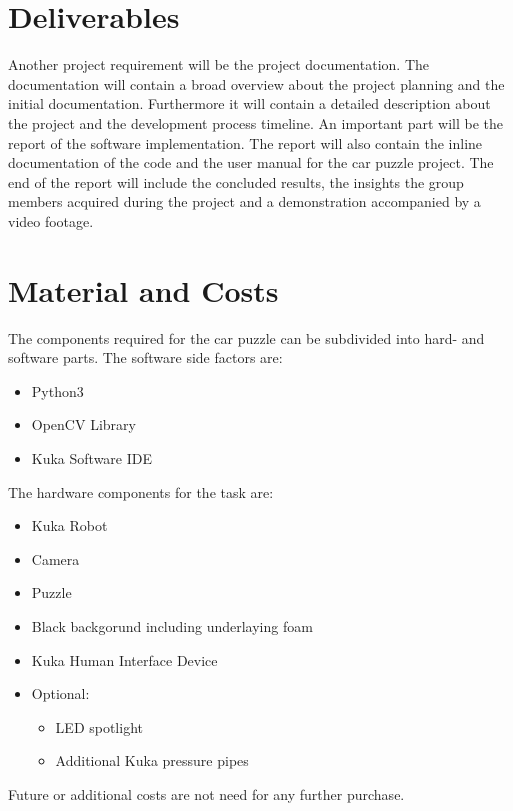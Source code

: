 \documentclass[a4paper, 12pt]{scrartcl}%
\begin{document}
\section{Deliverables}
Another project requirement will be the project documentation. The documentation will contain a broad overview about the project planning and the initial documentation. Furthermore it will contain a detailed description about the project and the development process timeline. An important part will be the report of the software implementation. The report will also contain the inline documentation of the code and the user manual for the car puzzle project.\newline
The end of the report will include the concluded results, the insights the group members acquired during the project and a demonstration accompanied by a video footage.\newline

\section{Material and Costs}
The components required for the car puzzle can be subdivided into hard- and software parts. The software side factors are:\newline
\begin{itemize}
\item Python3
\item OpenCV Library
\item Kuka Software IDE
\end{itemize}
The hardware components for the task are:\newline
\begin{itemize}
	\item Kuka Robot
	\item Camera
	\item Puzzle
	\item Black backgorund including underlaying foam
	\item Kuka Human Interface Device
	\item Optional:
	\begin{itemize}
		\item LED spotlight
		\item Additional Kuka pressure pipes
	\end{itemize}
\end{itemize}
Future or additional costs are not need for any further purchase.\newline
\end{document}
